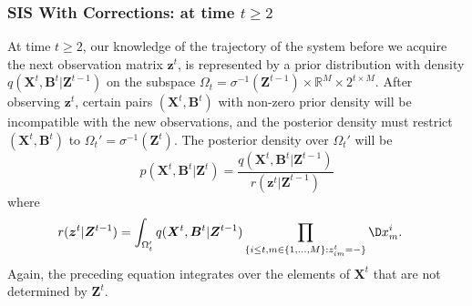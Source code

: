 \documentclass[9pt, xcolor={dvipsnames,svgnames,table}]{beamer}
\newcommand{\Real}{\mathbb R}
\begin{document}
\begin{frame}
    \frametitle{SIS With Corrections: at time $t \geq 2$}
    At time $t \geq 2$, our knowledge of the trajectory of the system before we acquire the next observation matrix $\bm{z}^t$, is represented by a prior distribution with density $q(\bm{X}^t, \bm{B}^t | \bm{Z}^{t-1})$ on the subspace $\Omega_t = \sigma^{-1}(\bm{Z}^{t-1}) \times \Real^M \times 2^{t \times M}$. After observing $\bm{z}^t$, certain pairs $(\bm{X}^t, \bm{B}^t)$ with non-zero prior density will be incompatible with the new observations, and the posterior density must restrict $(\bm{X}^t, \bm{B}^t)$ to $\Omega_t' = \sigma^{-1}(\bm{Z}^t)$. \textcolor{PineGreen}{The posterior density} over $\Omega_t'$ will be
    \begin{equation*}
        p(\bm{X}^t, \bm{B}^t |\bm{Z}^t) = \frac{q(\bm{X}^t, \bm{B}^t | \bm{Z}^{t-1})}{r(\bm{z}^t | \bm{Z}^{t-1})} 
    \end{equation*}
    where
    \begin{align*}
        r(\bm{z}^t | \bm{Z}^{t-1})  &= \int_{\Omega_t'} q(\bm{X}^t, \bm{B}^t | \bm{Z}^{t-1}) \prod_{ \{ i \leq t, m \in \{1, \ldots, M \} : z^t_{im} = - \} } \D x^i_m.
    \end{align*}
    \textcolor{PineGreen}{Again, the preceding equation integrates over the elements of $\bm{X}^t$ that are not determined by $\bm{Z}^t$}.
\end{frame}
\end{document}
